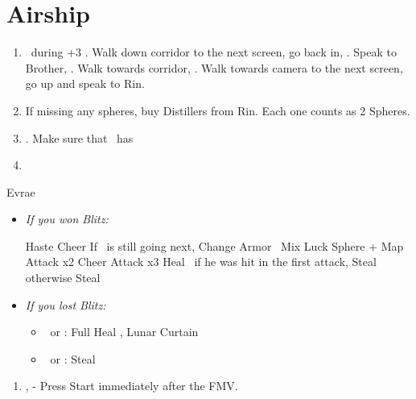 \chapter{Airship}

\begin{enumerate}
	\item \sd\ during \cs+3 \skippablefmv. Walk down corridor to the next screen, go back in, \sd. Speak to Brother, \sd. Walk towards corridor, \sd. Walk towards camera to the next screen, go up and speak to Rin.
	\item If missing any spheres, buy Distillers from Rin. Each one counts as 2 Spheres.
	\item \save. Make sure that \rikku\ has \od
	\item \formation{\tidus}{\rikku}{\kimahri}
\end{enumerate}
\vfill
\begin{battle}[32000]{Evrae}
	\begin{itemize}
	\item \textit{If you won Blitz:}
	\begin{itemize}
		\tidusf Haste \tidus
		\tidusf Cheer
		\tidusf If \tidus\ is still going next, Change Armor
		\rikkuf \od\ Mix Luck Sphere + Map
		\tidusf Attack x2
		\tidusf Cheer
		\tidusf Attack x3
		\kimahrif Heal \tidus\ if he was hit in the first attack, Steal otherwise
		\rikkuf Steal
	\end{itemize}
	\item \textit{If you lost Blitz:}
	\begin{itemize}
		\tidusf Haste \tidus
		\tidusf Cheer x2
		\tidusf Equip Baroque Sword
		\tidusf Attack x6
		\rikkuf \od\ Mix Luck Sphere + Map
		\item \kimahri\ or \rikku: Full Heal \tidus, Lunar Curtain \tidus
		\item \kimahri\ or \rikku: Steal
	\end{itemize}
\end{itemize}
\end{battle}
\begin{enumerate}[resume]
	\item \sd, \skippablefmv[3:00] - Press Start immediately after the FMV.
\end{enumerate}